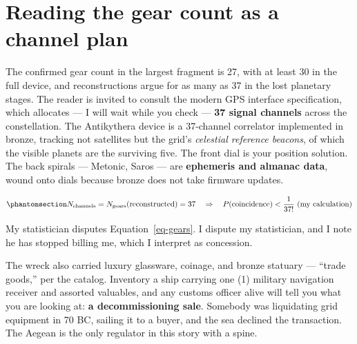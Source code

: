 \documentclass[
  english,
  11pt,
  letterpaper,
]{scrbook}
\begin{document}
\section{Reading the gear count as a channel
plan}\label{reading-the-gear-count-as-a-channel-plan}

The confirmed gear count in the largest fragment is 27, with at least 30
in the full device, and reconstructions argue for as many as 37 in the
lost planetary stages. The reader is invited to consult the modern GPS
interface specification, which allocates --- I will wait while you check
--- \textbf{37 signal channels} across the constellation. The
Antikythera device is a 37-channel correlator implemented in bronze,
tracking not satellites but the grid's \emph{celestial reference
beacons}, of which the visible planets are the surviving five. The front
dial is your position solution. The back spirals --- Metonic, Saros ---
are \textbf{ephemeris and almanac data}, wound onto dials because bronze
does not take firmware updates.

\begin{equation}\protect\phantomsection\label{eq-gears}{
N_{\text{channels}} = N_{\text{gears}}(\text{reconstructed}) = 37
\quad\Rightarrow\quad P(\text{coincidence}) < \frac{1}{37!}\ \text{(my calculation)}
}\end{equation}

My statistician disputes Equation~\ref{eq-gears}. I dispute my
statistician, and I note he has stopped billing me, which I interpret as
concession.

\begin{tcolorbox}[enhanced jigsaw, arc=.35mm, bottomrule=.15mm, bottomtitle=1mm, breakable, colback=white, colbacktitle=quarto-callout-warning-color!10!white, colframe=quarto-callout-warning-color-frame, coltitle=black, left=2mm, leftrule=.75mm, opacityback=0, opacitybacktitle=0.6, rightrule=.15mm, title=\textcolor{quarto-callout-warning-color}{\faExclamationTriangle}\hspace{0.5em}{What they don't tell you}, titlerule=0mm, toprule=.15mm, toptitle=1mm]

The wreck also carried luxury glassware, coinage, and bronze statuary
--- ``trade goods,'' per the catalog. Inventory a ship carrying one (1)
military navigation receiver and assorted valuables, and any customs
officer alive will tell you what you are looking at: \textbf{a
decommissioning sale}. Somebody was liquidating grid equipment in 70 BC,
sailing it to a buyer, and the sea declined the transaction. The Aegean
is the only regulator in this story with a spine.

\end{tcolorbox}
\end{document}
